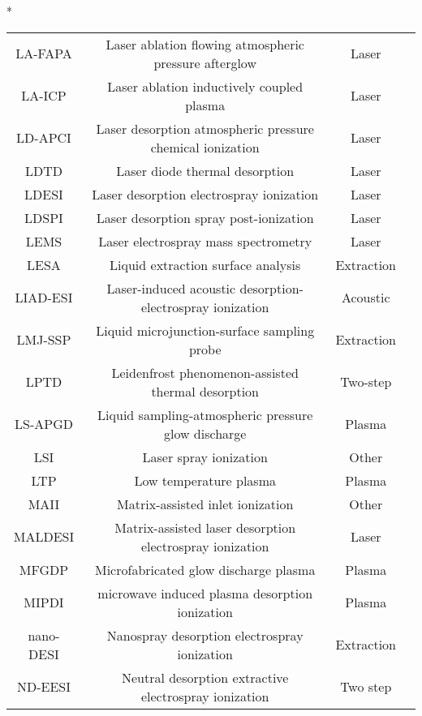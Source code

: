 \begin{table}{*}
\begin{tabular}{|c|c|c|l|}
        LA-FAPA & Laser ablation flowing atmospheric pressure afterglow & Laser & \cite{18826246} \\
        LA-ICP & Laser ablation inductively coupled plasma & Laser & \cite{2004} \\
        LD-APCI & Laser desorption atmospheric pressure chemical ionization & Laser & \cite{11921247} \\
        LDTD & Laser diode thermal desorption & Laser & \cite{17497828} \\
        LDESI & Laser desorption electrospray ionization & Laser & \cite{19504481, 25559448}\\
        LDSPI & Laser desorption spray post-ionization & Laser & \cite{20391610} \\ 
        LEMS & Laser electrospray mass spectrometry & Laser & \cite{19714710} \\
        LESA & Liquid extraction surface analysis & Extraction & \cite{22095508} \\
        LIAD-ESI & Laser-induced acoustic desorption-electrospray ionization & Acoustic & \cite{19178334} \\
        LMJ-SSP & Liquid microjunction-surface sampling probe & Extraction & \cite{19606841} \\
        LPTD & Leidenfrost phenomenon-assisted thermal desorption & Two-step & \cite{23423791} \\
        LS-APGD & Liquid sampling-atmospheric pressure glow discharge & Plasma & \cite{21910014} \\
        LSI & Laser spray ionization & Other & \cite{19955086} \\
        LTP & Low temperature plasma & Plasma & \cite{19551980} \\
        MAII & Matrix-assisted inlet ionization & Other & \cite{McEwen_2010} \\
        MALDESI & Matrix-assisted laser desorption electrospray ionization & Laser & \cite{16952462} \\
        MFGDP & Microfabricated glow discharge plasma & Plasma & \cite{Wang_2015}\\
        MIPDI & microwave induced plasma desorption ionization & Plasma & \cite{23534913} \\
        nano-DESI & Nanospray desorption electrospray ionization & Extraction & \cite{20593081} \\
        ND-EESI &  Neutral desorption extractive electrospray ionization & Two step & \cite{17721903} \\

\end{tabular}
\end{table}
